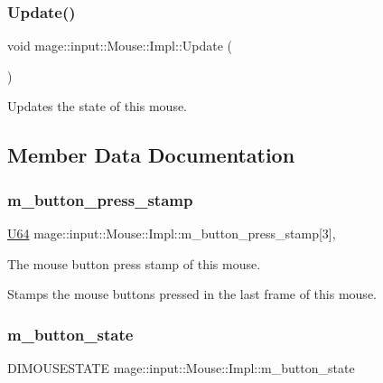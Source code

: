 \subsubsection{\texorpdfstring{Update()}{Update()}}
{\footnotesize\ttfamily void mage\+::input\+::\+Mouse\+::\+Impl\+::\+Update (\begin{DoxyParamCaption}{ }\end{DoxyParamCaption})\hspace{0.3cm}{\ttfamily [noexcept]}}

Updates the state of this mouse. 

\subsection{Member Data Documentation}
\hypertarget{classmage_1_1input_1_1_mouse_1_1_impl_af3ea37adb563ff1c353d8358a6a74818}{}\label{classmage_1_1input_1_1_mouse_1_1_impl_af3ea37adb563ff1c353d8358a6a74818} 
\subsubsection{\texorpdfstring{m\+\_\+button\+\_\+press\+\_\+stamp}{m\_button\_press\_stamp}}
{\footnotesize\ttfamily \hyperlink{namespacemage_a6672cf3c861707ce4a3235a3eb43941d}{U64} mage\+::input\+::\+Mouse\+::\+Impl\+::m\+\_\+button\+\_\+press\+\_\+stamp\mbox{[}3\mbox{]}\hspace{0.3cm}{\ttfamily [mutable]}, {\ttfamily [private]}}

The mouse button press stamp of this mouse.

Stamps the mouse buttons pressed in the last frame of this mouse. \hypertarget{classmage_1_1input_1_1_mouse_1_1_impl_a2ef89cc9d05fde7a7145c774380878cb}{}\label{classmage_1_1input_1_1_mouse_1_1_impl_a2ef89cc9d05fde7a7145c774380878cb} 
\subsubsection{\texorpdfstring{m\+\_\+button\+\_\+state}{m\_button\_state}}
{\footnotesize\ttfamily D\+I\+M\+O\+U\+S\+E\+S\+T\+A\+TE mage\+::input\+::\+Mouse\+::\+Impl\+::m\+\_\+button\+\_\+state\hspace{0.3cm}{\ttfamily [private]}}


